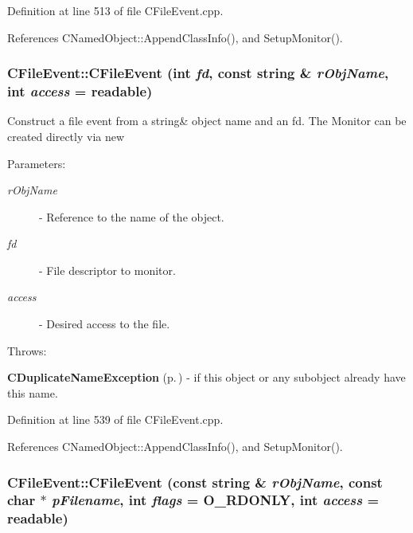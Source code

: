 Definition at line 513 of file CFile\-Event.cpp.

References CNamed\-Object::Append\-Class\-Info(), and Setup\-Monitor().
\subsubsection{\setlength{\rightskip}{0pt plus 5cm}CFile\-Event::CFile\-Event (int {\em fd}, const string \& {\em r\-Obj\-Name}, int {\em access} = {\bf readable})}\label{classCFileEvent_a6}


Construct a file event from a string\& object name and an fd. The Monitor can be created directly via new \begin{Desc}
\item[Parameters: ]\par
\begin{description}
\item[{\em 
r\-Obj\-Name}]- Reference to the name of the object. \item[{\em 
fd}]- File descriptor to monitor. \item[{\em 
access}]- Desired access to the file.\end{description}
\end{Desc}
Throws:\begin{CompactItemize}
\item 
{\bf CDuplicate\-Name\-Exception} {\rm (p.\,\pageref{classCDuplicateNameException})} - if this object or any subobject already have this name. \end{CompactItemize}


Definition at line 539 of file CFile\-Event.cpp.

References CNamed\-Object::Append\-Class\-Info(), and Setup\-Monitor().
\subsubsection{\setlength{\rightskip}{0pt plus 5cm}CFile\-Event::CFile\-Event (const string \& {\em r\-Obj\-Name}, const char $\ast$ {\em p\-Filename}, int {\em flags} = O\_\-RDONLY, int {\em access} = {\bf readable})}\label{classCFileEvent_a7}


